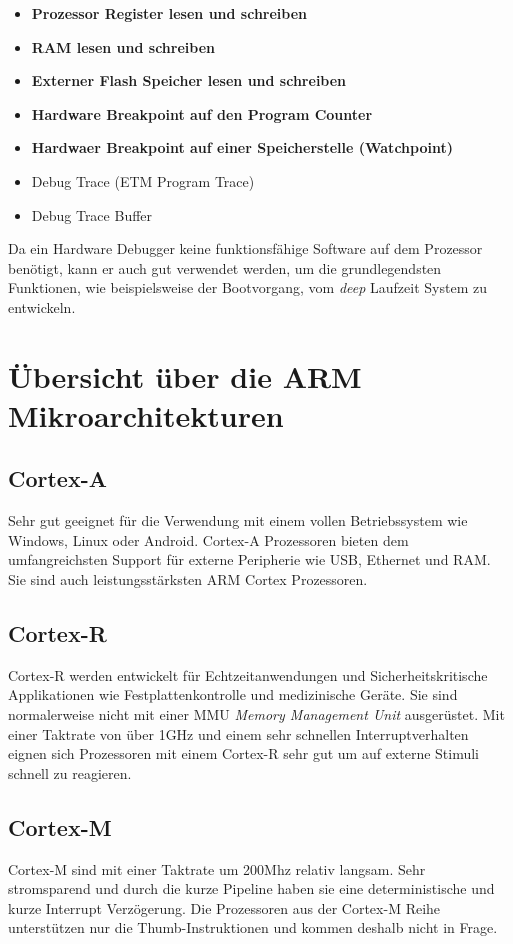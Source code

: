 \begin{itemize}
	\item \textbf{Prozessor Register lesen und schreiben}
	\item \textbf{RAM lesen und schreiben}
	\item \textbf{Externer Flash Speicher lesen und schreiben} 
	\item \textbf{Hardware Breakpoint auf den Program Counter} 
	\item \textbf{Hardwaer Breakpoint auf einer Speicherstelle (Watchpoint)} 
	\item Debug Trace (ETM Program Trace) 
	\item Debug Trace Buffer
\end{itemize}

Da ein Hardware Debugger keine funktionsfähige Software auf dem Prozessor benötigt, kann er auch gut verwendet werden, um die grundlegendsten Funktionen, wie beispielsweise der Bootvorgang, vom \textit{deep} Laufzeit System zu entwickeln.




\section{Übersicht über die ARM Mikroarchitekturen}
\subsection{Cortex-A}
Sehr gut geeignet für die Verwendung mit einem vollen Betriebssystem wie Windows, Linux oder Android.
Cortex-A Prozessoren bieten dem umfangreichsten Support für externe Peripherie wie USB, Ethernet und RAM.
Sie sind auch leistungsstärksten ARM Cortex Prozessoren.

\subsection{Cortex-R}
Cortex-R werden entwickelt für Echtzeitanwendungen und Sicherheitskritische Applikationen wie Festplattenkontrolle und medizinische Geräte.
Sie sind normalerweise nicht mit einer MMU \textit{Memory Management Unit} ausgerüstet.
Mit einer Taktrate von über 1GHz und einem sehr schnellen Interruptverhalten eignen sich Prozessoren mit einem Cortex-R sehr gut um auf externe Stimuli schnell zu reagieren.

\subsection{Cortex-M}
Cortex-M sind mit einer Taktrate um 200Mhz relativ langsam.
Sehr stromsparend und durch die kurze Pipeline haben sie eine deterministische und kurze Interrupt Verzögerung.
Die Prozessoren aus der Cortex-M Reihe unterstützen nur die Thumb-Instruktionen und kommen deshalb nicht in Frage.


